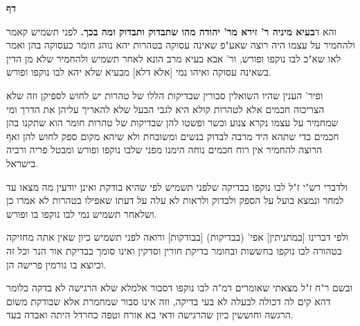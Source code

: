 \documentclass[12pt, openany]{book}
\newcommand{\sethebfont}{
\fontsize{10.5pt}{21.0pt} \selectfont
}
\newcommand{\twocol}[1]{
	{\sethebfont \begin{multicols}{2}
			#1
	\end{multicols}}	
}
\newcommand{\chapname}{}
\newcommand{\newchap}[1]{
	\addcontentsline{toc}{chapter}{#1}
	\renewcommand{\chapname}{#1}
		\begin{center}
			\textbf{%
\fontsize{16pt}{16pt}\selectfont
				#1}
		\end{center}
}
\begin{document}
\newchap{דף }
\twocol{ והא ד\textbf{בעיא מיניה ר' זירא מר' יהודה מהו שתבדוק ותבדוק ומה בכך.}  לפני תשמיש קאמר ולהחמיר על עצמו היה רוצה שאע"פ שאינה עסוקה בטהרות יהא נוהג חומר כעסוקה בהן ואמר לאו שא"כ לבו נוקפו ופורש, ור' אבא בעיא מרב הונא לאחר תשמיש ולהחמיר שלא מן הדין בשאינה עסוקה ואיהו נמי [אלא דלא] מבעיא שלא יהא לבו נוקפו ופורש.\par  ופיר' הענין שהיו השואלין סבורין שבדיקות הללו של טהרות יש לחוש לספיקן וזה שלא הצריכוה חכמים אלא לטהרות קולא היא לגבי הבעל שלא להאריך עליהן את הדרך ומי שמחמיר על עצמו נקרא צנוע וכשר ופשטו להן שבדיקות של טהרות חומר הוא שתקנו בהן חכמים כדי שתהא היד מרבה לבדוק בנשים ומשובחת ולא שיהא מקום ספק לחוש להן ואף הרוצה להחמיר אין רוח חכמים נוחה הימנו מפני שלבו נוקפו ופורש ומבטל פריה ורביה בישראל.\par  ולדברי רש"י ז"ל לבו נוקפו בבדיקה שלפני תשמיש לפי שהיא בודקת ואינן יודעין מה מצאו עד למחר ונמצא בועל על הספק ולבדוק ולראות לא עלה על דעתו שאפילו בטהרות לא אמרו כן ושלאחר תשמיש נמי לבו נוקפו בו ופורש.\par ולפי דברינו [במתניתין] אפי' (בבדיקות) [בבודקות] ורואה לפני תשמיש כיון שאין אתה מחזיקה בטהורה לבו נוקפו בחששות ובחומר בדיקת חורין וסדקין ואינו סומך בבדיקת אור הנר וכל זה וכיוצא בו גורמין פרישה הן.\par ובשם ר"ח ז"ל מצאתי שאומרים דמ"ה לבו נוקפו דסבור אלמלא שלא הרגישה לא בדקה כלומר דהא קים לה דכולה לבעלה לא בעי בדיקה, וזה אינו סבור שמחמרת אלא שבודקת משום הרגשה וחוששין כיון שהרגישה ודאי בא אורח וטפה כחרדל היתה ואבדה בעד. 
}
\end{document}
